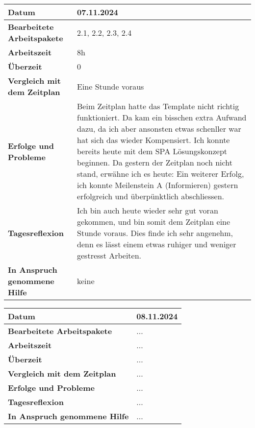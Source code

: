 \begin{longtable}{p{}|p{}}
	\hline
	\textbf{Datum}                       & 07.11.2024 \\
	\hline
	\textbf{Bearbeitete Arbeitspakete}   & 2.1, 2.2, 2.3, 2.4 \\
	\hline
	\textbf{Arbeitszeit}                 & 8h \\
	\hline
	\textbf{Überzeit}                    & 0 \\
	\hline
	\textbf{Vergleich mit dem Zeitplan}  & Eine Stunde voraus \\
	\hline
	\textbf{Erfolge und Probleme}        & Beim Zeitplan hatte das Template nicht richtig funktioniert. Da kam ein bisschen extra Aufwand dazu, da ich aber ansonsten etwas schenller war hat sich das wieder Kompensiert. Ich konnte bereits heute mit dem SPA Lösungskonzept beginnen. Da gestern der Zeitplan noch nicht stand, erwähne ich es heute: Ein weiterer Erfolg, ich konnte
Meilenstein A (Informieren)	gestern erfolgreich und überpünktlich abschliessen.\\
	\hline
	\textbf{Tagesreflexion}              & Ich bin auch heute wieder sehr gut voran gekommen, und bin somit dem Zeitplan eine Stunde voraus. Dies finde ich sehr angenehm, denn es lässt einem etwas ruhiger und weniger gestresst Arbeiten.\\
	\hline
	\textbf{In Anspruch genommene Hilfe} & keine\\
	\hline
\end{longtable}\label{tab:arbeitsprotokoll-tag2}

\newpage

\begin{longtable}{p{}|p{}}
	\hline
	\textbf{Datum}                       & 08.11.2024 \\
	\hline
	\textbf{Bearbeitete Arbeitspakete}   & ... \\
	\hline
	\textbf{Arbeitszeit}                 & ... \\
	\hline
	\textbf{Überzeit}                    & ... \\
	\hline
	\textbf{Vergleich mit dem Zeitplan}  & ... \\
	\hline
	\textbf{Erfolge und Probleme}        & ...
	\\
	\hline
	\textbf{Tagesreflexion}              & ...
	\\
	\hline
	\textbf{In Anspruch genommene Hilfe} & ... \\
	\hline
\end{longtable}\label{tab:arbeitsprotokoll-tag3}
\newpage

